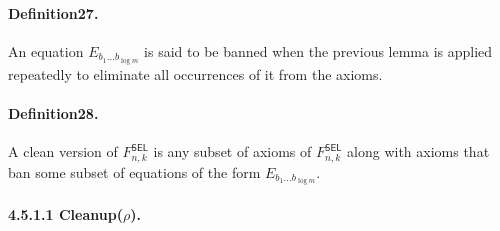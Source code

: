 \documentclass[10pt,a4paper]{article}
\begin{document}
\paragraph{Definition27.} An equation $E_{b_1\ldots b_{\log m}}$ is said to be banned when the previous lemma is applied repeatedly to eliminate all occurrences of it from the axioms.
\paragraph{Definition28.} A clean version of $F^{\mathsf{SEL}}_{n,k}$ is any subset of axioms of $F^{\mathsf{SEL}}_{n,k}$ along with axioms that ban some subset of equations of the form $E_{b_1\ldots b_{\log m}}$.
\paragraph{4.5.1.1 Cleanup($\rho$).}
\end{document}
